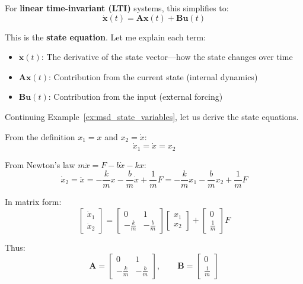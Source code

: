 For \textbf{linear time-invariant (LTI)} systems, this simplifies to:
\begin{equation}
\boxed{\dot{\mathbf{x}}(t) = \mathbf{A}\mathbf{x}(t) + \mathbf{B}\mathbf{u}(t)}
\label{eq:state_equation}
\end{equation}

This is the \textbf{state equation}. Let me explain each term:
\begin{itemize}
    \item $\dot{\mathbf{x}}(t)$: The derivative of the state vector---how the state changes over time
    \item $\mathbf{A}\mathbf{x}(t)$: Contribution from the current state (internal dynamics)
    \item $\mathbf{B}\mathbf{u}(t)$: Contribution from the input (external forcing)
\end{itemize}

\begin{example}
Continuing Example~\ref{ex:msd_state_variables}, let us derive the state equations.

From the definition $x_1 = x$ and $x_2 = \dot{x}$:
\begin{equation}
\dot{x}_1 = \dot{x} = x_2
\end{equation}

From Newton's law $m\ddot{x} = F - b\dot{x} - kx$:
\begin{equation}
\dot{x}_2 = \ddot{x} = -\frac{k}{m}x - \frac{b}{m}\dot{x} + \frac{1}{m}F = -\frac{k}{m}x_1 - \frac{b}{m}x_2 + \frac{1}{m}F
\end{equation}

In matrix form:
\begin{equation}
\begin{bmatrix} \dot{x}_1 \\ \dot{x}_2 \end{bmatrix} = \begin{bmatrix} 0 & 1 \\ -\frac{k}{m} & -\frac{b}{m} \end{bmatrix} \begin{bmatrix} x_1 \\ x_2 \end{bmatrix} + \begin{bmatrix} 0 \\ \frac{1}{m} \end{bmatrix} F
\end{equation}

Thus:
\begin{equation}
\mathbf{A} = \begin{bmatrix} 0 & 1 \\ -\frac{k}{m} & -\frac{b}{m} \end{bmatrix}, \qquad \mathbf{B} = \begin{bmatrix} 0 \\ \frac{1}{m} \end{bmatrix}
\end{equation}
\end{example}

